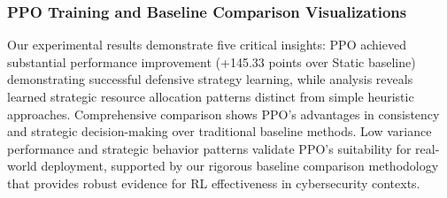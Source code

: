 \documentclass[12pt,oneside]{article}
\begin{document}
\subsubsection{PPO Training and Baseline Comparison Visualizations}

Our experimental results demonstrate five critical insights: PPO achieved substantial performance improvement (+145.33 points over Static baseline) demonstrating successful defensive strategy learning, while analysis reveals learned strategic resource allocation patterns distinct from simple heuristic approaches. Comprehensive comparison shows PPO's advantages in consistency and strategic decision-making over traditional baseline methods. Low variance performance and strategic behavior patterns validate PPO's suitability for real-world deployment, supported by our rigorous baseline comparison methodology that provides robust evidence for RL effectiveness in cybersecurity contexts.
\end{document}
